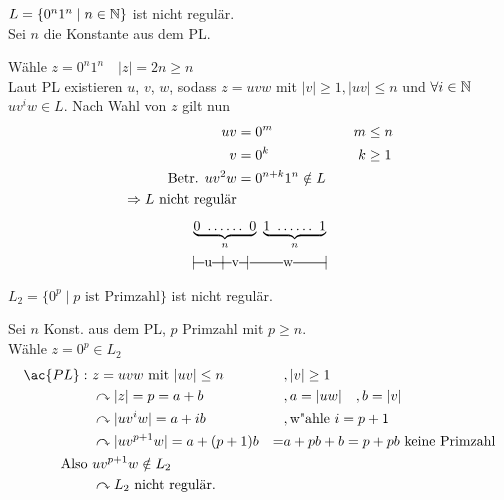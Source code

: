 \begin{Bsp*}
	$L=\{0^n1^n \mid n\in\mathbb{N}\}$ ist nicht regulär.\\
	Sei $n$ die Konstante aus dem \ac{PL}.
	
	Wähle $z=0^n1^n \quad |z|=2n\geq n$\\
	Laut PL existieren $u$, $v$, $w$, sodass $z=uvw$ mit $|v|\geq 1, |uv|\leq n$ und $\forall i \in \mathbb{N}$ $uv^iw \in L$. Nach Wahl von $z$ gilt nun
	{\setlength\belowdisplayskip{0pt}
	\begin{alignat*}{2}
		uv &= 0^m &\quad m&\leq n\\
		v &= 0^k & k&\geq 1\\
		\text{Betr. } uv^2w &= 0^{n+k}1^n \notin L\\
		\=> L\text{ nicht regulär}
	\end{alignat*}
	\begin{gather*}
		\underbrace{0\ \dots\dots\ 0}_{n} \ \underbrace{1\ \dots\dots\ 1}_{n}\\
		|\!\ruleplaceholder[u]{\widthof{0\ \dots }} \!|\! \ruleplaceholder[v]{\widthof{\dots 0}}\!|%
		\ruleplaceholder[w]{\widthof{\ \ \ $1\ \dots\dots\ 1$}}\!|
	\end{gather*}
	}
\end{Bsp*}
\begin{Bsp*}
$L_2 = \{0^p \mid p\text{ ist Primzahl}\}$ ist nicht regulär.

Sei $n$ Konst. aus dem \ac{PL}, $p$ Primzahl mit $p \geq n$.\\
Wähle $z=0^p \in L_2$
\begin{align*}
	\ac{PL}:\ &z=uvw \text{ mit } |uv|\leq n &&,|v| \geq 1\\
	&\curvearrowright |z|= p=a+b &&, a = |uw| \quad, b= |v|\\
	&\curvearrowright |uv^iw| = a + ib &&, \text{w"ahle }i=p+1\\
	&\curvearrowright |uv^{p+1}w| = a + (p+1)b & =& a + pb + b = p+pb \text{ keine Primzahl} \\
	\text{Also } &uv^{p+1}w \notin L_2\\
	&\curvearrowright L_2\text{ nicht regulär.}
\end{align*}
\end{Bsp*}

